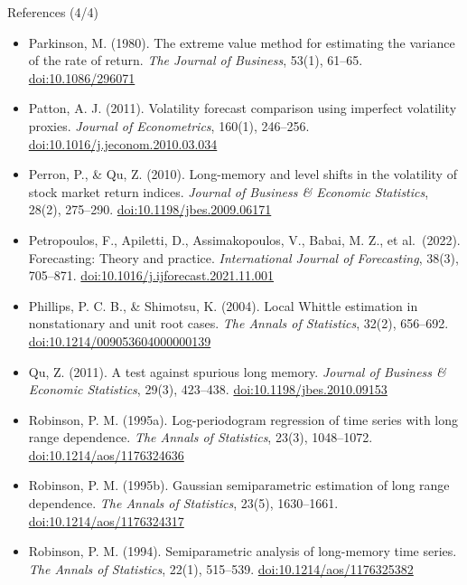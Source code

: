 \begin{frame}{References (4/4)}
\itemsize{\tiny}
\begin{itemize}
    \item Parkinson, M. (1980). The extreme value method for estimating the variance of the rate of return. \textit{The Journal of Business}, 53(1), 61--65. \href{https://doi.org/10.1086/296071}{doi:10.1086/296071}
    \item Patton, A. J. (2011). Volatility forecast comparison using imperfect volatility proxies. \textit{Journal of Econometrics}, 160(1), 246--256. \href{https://doi.org/10.1016/j.jeconom.2010.03.034}{doi:10.1016/j.jeconom.2010.03.034}
    \item Perron, P., \& Qu, Z. (2010). Long-memory and level shifts in the volatility of stock market return indices. \textit{Journal of Business \& Economic Statistics}, 28(2), 275--290. \href{https://doi.org/10.1198/jbes.2009.06171}{doi:10.1198/jbes.2009.06171}
    \item Petropoulos, F., Apiletti, D., Assimakopoulos, V., Babai, M. Z., et al.\ (2022). Forecasting: Theory and practice. \textit{International Journal of Forecasting}, 38(3), 705--871. \href{https://doi.org/10.1016/j.ijforecast.2021.11.001}{doi:10.1016/j.ijforecast.2021.11.001}
    \item Phillips, P. C. B., \& Shimotsu, K. (2004). Local Whittle estimation in nonstationary and unit root cases. \textit{The Annals of Statistics}, 32(2), 656--692. \href{https://doi.org/10.1214/009053604000000139}{doi:10.1214/009053604000000139}
    \item Qu, Z. (2011). A test against spurious long memory. \textit{Journal of Business \& Economic Statistics}, 29(3), 423--438. \href{https://doi.org/10.1198/jbes.2010.09153}{doi:10.1198/jbes.2010.09153}
    \item Robinson, P. M. (1995a). Log-periodogram regression of time series with long range dependence. \textit{The Annals of Statistics}, 23(3), 1048--1072. \href{https://doi.org/10.1214/aos/1176324636}{doi:10.1214/aos/1176324636}
    \item Robinson, P. M. (1995b). Gaussian semiparametric estimation of long range dependence. \textit{The Annals of Statistics}, 23(5), 1630--1661. \href{https://doi.org/10.1214/aos/1176324317}{doi:10.1214/aos/1176324317}
    \item Robinson, P. M. (1994). Semiparametric analysis of long-memory time series. \textit{The Annals of Statistics}, 22(1), 515--539. \href{https://doi.org/10.1214/aos/1176325382}{doi:10.1214/aos/1176325382}

\end{itemize}
\end{frame}
